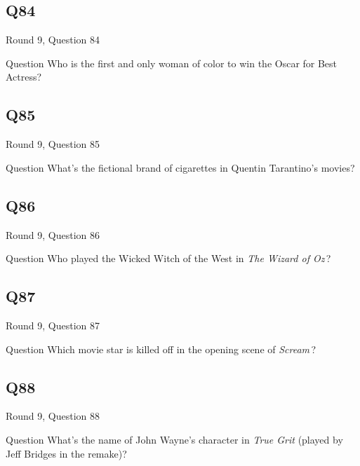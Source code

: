 \documentclass[11pt]{beamer}
\begin{document}
\subsection*{Q84}
\begin{frame}[t]{Round 9, Question 84}
\vspace{2em}
\begin{block}{Question}
Who is the first and only woman of color to win the Oscar for Best Actress?
\end{block}
\end{frame}
    

\subsection*{Q85}
\begin{frame}[t]{Round 9, Question 85}
\vspace{2em}
\begin{block}{Question}
What's the fictional brand of cigarettes in Quentin Tarantino's movies?
\end{block}
\end{frame}
    

\subsection*{Q86}
\begin{frame}[t]{Round 9, Question 86}
\vspace{2em}
\begin{block}{Question}
Who played the Wicked Witch of the West in \emph{The Wizard of Oz}\,?
\end{block}
\end{frame}
    

\subsection*{Q87}
\begin{frame}[t]{Round 9, Question 87}
\vspace{2em}
\begin{block}{Question}
Which movie star is killed off in the opening scene of \emph{Scream}\,?
\end{block}
\end{frame}
    

\subsection*{Q88}
\begin{frame}[t]{Round 9, Question 88}
\vspace{2em}
\begin{block}{Question}
What's the name of John Wayne's character in \emph{True Grit} (played by Jeff Bridges in the remake)?
\end{block}
\end{frame}
    
\end{document}
